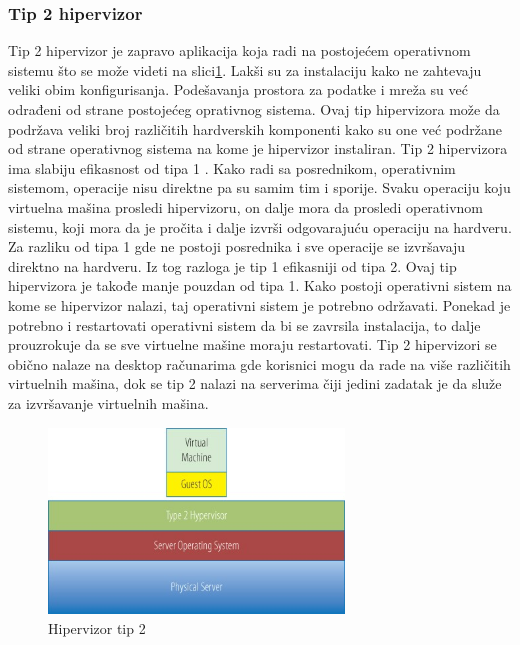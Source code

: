 \documentclass[12pt,oneside]{memoir}
\begin{document}
\subsubsection{Tip 2 hipervizor}
Tip 2 hipervizor je zapravo aplikacija koja radi na postojećem operativnom sistemu što se može videti na slici\ref{fig:hipervizorTip2}. Lakši su za instalaciju kako ne zahtevaju veliki obim konfigurisanja. Podešavanja prostora za podatke i mreža su već odrađeni od strane postojećeg oprativnog sistema. Ovaj tip hipervizora može da podržava veliki broj različitih hardverskih komponenti kako su one već podržane od strane operativnog sistema na kome je hipervizor instaliran. Tip 2 hipervizora ima slabiju efikasnost od tipa 1 \cite{ve}. Kako radi sa posrednikom, operativnim sistemom, operacije nisu direktne pa su samim tim i sporije. Svaku operaciju koju virtuelna mašina prosledi hipervizoru, on dalje mora da prosledi operativnom sistemu, koji mora da je pročita i dalje izvrši odgovarajuću operaciju na hardveru. Za razliku od tipa 1 gde ne postoji posrednika i sve operacije se izvršavaju direktno na hardveru. Iz tog razloga je tip 1 efikasniji od tipa 2. 
Ovaj tip hipervizora je takođe manje pouzdan od tipa 1. Kako postoji operativni sistem na kome se hipervizor nalazi, taj operativni sistem je potrebno održavati. Ponekad je potrebno i restartovati operativni sistem da bi se zavrsila instalacija, to dalje prouzrokuje da se sve virtuelne mašine moraju restartovati. Tip 2 hipervizori se obično nalaze na desktop računarima gde korisnici mogu da rade na više različitih virtuelnih mašina, dok se tip 2 nalazi na serverima čiji jedini zadatak je da služe za izvršavanje virtuelnih mašina.

\begin{figure}[!ht]
  \centering
  \includegraphics[width=0.7\textwidth]{Slika 3.jpg}
  \caption{Hipervizor tip 2}
  \label{fig:hipervizorTip2}
\end{figure}
\end{document}
